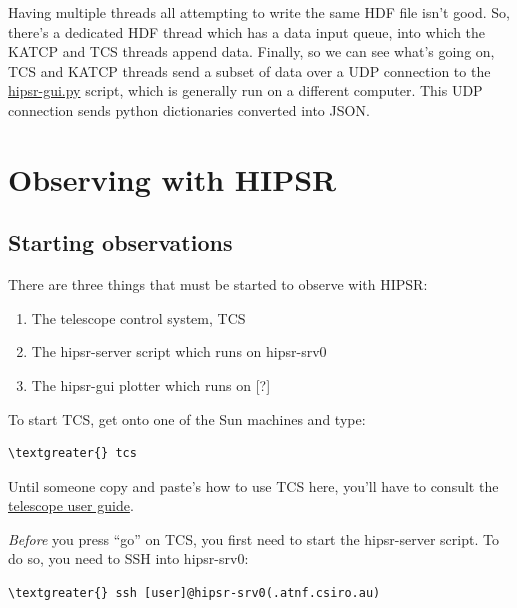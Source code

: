 \documentclass[letterpaper,10pt,english]{sphinxmanual}
\begin{document}
Having multiple threads all attempting to write the same HDF file isn't good. So, there's a dedicated
HDF thread which has a data input queue, into which the KATCP and TCS threads append data. Finally,
so we can see what's going on, TCS and KATCP threads send a subset of data over a UDP connection to
the {\hyperref[user_guide:hipsr-gui-py]{hipsr-gui.py}} script, which is generally run on a different computer. This UDP connection sends
python dictionaries converted into JSON.


\section{Observing with HIPSR}
\label{user_guide:observing-with-hipsr}

\subsection{Starting observations}
\label{user_guide:starting-observations}
There are three things that must be started to observe with HIPSR:
\begin{enumerate}
\item {} 
The telescope control system, TCS

\item {} 
The hipsr-server script which runs on hipsr-srv0

\item {} 
The hipsr-gui plotter which runs on {[}?{]}

\end{enumerate}

To start TCS, get onto one of the Sun machines and type:

\begin{Verbatim}[commandchars=\\\{\}]
\textgreater{} tcs
\end{Verbatim}

Until someone copy and paste's how to use TCS here, you'll have to consult the \href{http://www.parkes.atnf.csiro.au/observing/documentation/user\_guide/}{telescope user guide}.

\emph{Before} you press ``go'' on TCS, you first need to start the hipsr-server script. To do so,
you need to SSH into hipsr-srv0:

\begin{Verbatim}[commandchars=\\\{\}]
\textgreater{} ssh [user]@hipsr-srv0(.atnf.csiro.au)
\end{Verbatim}
\end{document}
